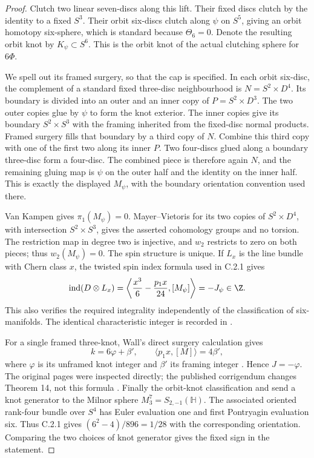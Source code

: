 \begin{proof}
Clutch two linear seven-discs along this lift. Their fixed discs
clutch by the identity to a fixed $S^3$. Their orbit six-discs
clutch along $\psi$ on $S^5$, giving an orbit homotopy six-sphere,
which is standard because $\Theta_6=0$. Denote the resulting
orbit knot by $K_\psi\subset S^6$. This is the orbit knot of
the actual clutching sphere for $6\Phi$.

We spell out its framed surgery, so that the cap is specified.
In each orbit six-disc, the complement of a standard fixed
three-disc neighbourhood is $N=S^2\times D^4$. Its boundary
is divided into an outer and an inner copy of $P=S^2\times D^3$.
The two outer copies glue by $\psi$ to form the knot exterior.
The inner copies give its boundary $S^2\times S^3$ with the
framing inherited from the fixed-disc normal products. Framed
surgery fills that boundary by a third copy of $N$.
Combine this third copy with one of the first two along its
inner $P$. Two four-discs glued along a boundary three-disc
form a four-disc. The combined piece is therefore again $N$,
and the remaining gluing map is $\psi$ on the outer half and
the identity on the inner half. This is exactly the displayed
$M_\psi$, with the boundary orientation convention used there.

Van Kampen gives $\pi_1(M_\psi)=0$. Mayer--Vietoris for its
two copies of $S^2\times D^4$, with intersection $S^2\times S^3$,
gives the asserted cohomology groups and no torsion. The
restriction map in degree two is injective, and $w_2$ restricts
to zero on both pieces; thus $w_2(M_\psi)=0$. The spin
structure is unique. If $L_x$ is the line bundle with Chern
class $x$, the twisted spin index formula used in C.2.1 gives
\[
 \operatorname{ind}(D\otimes L_x)
 =\left\langle\frac{x^3}{6}-\frac{p_1x}{24},[M_\psi]\right\rangle
 =-J_\psi\in\Z.
\]
This also verifies the required integrality independently of the
classification of six-manifolds. The identical characteristic
integer is recorded in \citet[Section 3, page 1911]{Olbermann2010D}.

For a single framed three-knot, Wall's direct surgery calculation
gives
\[
 k=6\varphi+\beta',\qquad \langle p_1x,[M]\rangle=4\beta',
\]
where $\varphi$ is its unframed knot integer and $\beta'$ its
framing integer
\citep[Theorem 4, pages 360--361]{Wall1966VE}.
Hence $J=-\varphi$. The original pages were inspected directly;
the published corrigendum changes Theorem 14, not this formula
\citep{Wall1967CorrE}. Finally the orbit-knot classification and
\citet[Example 7.14 and Proposition 7.15]{Davis1982D} send a
knot generator to the Milnor sphere $M^7_3=S_{2,-1}(\mathbb H)$.
The associated oriented rank-four bundle over $S^4$ has Euler
evaluation one and first Pontryagin evaluation six. Thus C.2.1
gives $(6^2-4)/896=1/28$ with the corresponding
orientation. Comparing the two choices of knot generator gives
the fixed sign in the statement.


\end{proof}
